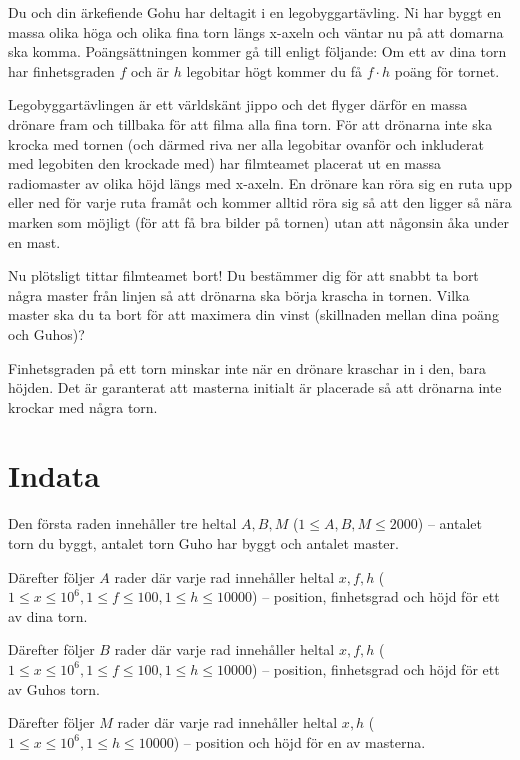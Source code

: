 

Du och din ärkefiende Gohu har deltagit i en legobyggartävling.
Ni har byggt en massa olika höga och olika fina torn längs x-axeln och väntar nu på att domarna ska komma.
Poängsättningen kommer gå till enligt följande: Om ett av dina torn har finhetsgraden $f$ och är $h$ legobitar högt kommer du få $f\cdot h$ poäng för tornet.

Legobyggartävlingen är ett världskänt jippo och det flyger därför en massa drönare fram och tillbaka för att filma alla fina torn.
För att drönarna inte ska krocka med tornen (och därmed riva ner alla legobitar ovanför och inkluderat med legobiten den krockade med) har filmteamet placerat ut en massa radiomaster av olika höjd längs med x-axeln.
En drönare kan röra sig en ruta upp eller ned för varje ruta framåt och kommer alltid röra sig så att den ligger så nära marken som möjligt (för att få bra bilder på tornen) utan att någonsin åka under en mast.

Nu plötsligt tittar filmteamet bort!
Du bestämmer dig för att snabbt ta bort några master från linjen så att drönarna ska börja krascha in tornen.
Vilka master ska du ta bort för att maximera din vinst (skillnaden mellan dina poäng och Guhos)?

Finhetsgraden på ett torn minskar inte när en drönare kraschar in i den, bara höjden.
Det är garanterat att masterna initialt är placerade så att drönarna inte krockar med några torn.


\section*{Indata}
Den första raden innehåller tre heltal $A,B,M$ ($1 \leq A,B,M \leq 2000$) -- antalet torn du byggt, antalet torn Guho har byggt och antalet master.

Därefter följer $A$ rader där varje rad innehåller heltal $x,f,h$ ($1 \leq x \leq 10^6, 1 \le f \le 100, 1\leq h \leq 10000$) -- position, finhetsgrad och höjd för ett av dina torn.

Därefter följer $B$ rader där varje rad innehåller heltal $x,f,h$ ($1 \leq x \leq 10^6, 1 \le f \le 100, 1\leq h \leq 10000$) -- position, finhetsgrad och höjd för ett av Guhos torn.

Därefter följer $M$ rader där varje rad innehåller heltal $x,h$ ($1 \leq x \leq 10^6, 1\leq h \leq 10000$) -- position och höjd för en av masterna.


